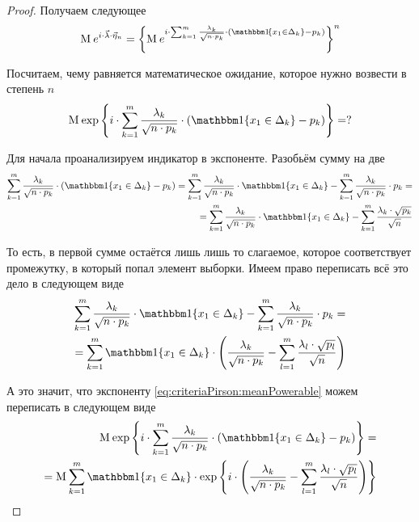 \begin{proof}
  Получаем следующее
  \begin{align*}
      \mean{e^{i \cdot \vec{\lambda} \cdot \vec{\eta}_n}}
      = \left\{ \mean{e^{i \cdot \sum_{k=1}^{m}\frac{\lambda_k}{
          \sqrt{n \cdot p_k}} \cdot \left(
          \Indicator{x_1 \in \Delta_k} - p_k \right)}} \right\}^n
  \end{align*}

  Посчитаем, чему равняется математическое ожидание, которое нужно возвести
  в степень $n$
  \begin{equation}\label{eq:criteriaPirson:meanPowerable}
      \mean{\exp{\left\{ i \cdot \sum_{k=1}^{m}\frac{\lambda_k}{
          \sqrt{n \cdot p_k}} \cdot \left(
          \Indicator{x_1 \in \Delta_k} - p_k \right) \right\}}} = ?
  \end{equation}

  Для начала проанализируем индикатор в экспоненте.
  Разобьём сумму на две
  \begin{align*}
      \sum_{k=1}^{m}\frac{\lambda_k}{\sqrt{n \cdot p_k}} \cdot \left(
          \Indicator{x_1 \in \Delta_k} - p_k \right)
      = \sum_{k=1}^{m}\frac{\lambda_k}{\sqrt{n \cdot p_k}}
          \cdot \Indicator{x_1 \in \Delta_k}
      - \sum_{k=1}^{m}\frac{\lambda_k}{\sqrt{n \cdot p_k}} \cdot p_k = \\
      = \sum_{k=1}^{m}\frac{\lambda_k}{\sqrt{n \cdot p_k}}
          \cdot \Indicator{x_1 \in \Delta_k}
      - \sum_{k=1}^{m}\frac{\lambda_k \cdot \sqrt{p_k}}{\sqrt{n}}
  \end{align*}

  То есть, в первой сумме остаётся лишь лишь то слагаемое, которое
  соответствует промежутку, в который попал элемент выборки. Имеем право
  переписать всё это дело в следующем виде
  \begin{align*}
      \sum_{k=1}^{m}\frac{\lambda_k}{\sqrt{n \cdot p_k}}
          \cdot \Indicator{x_1 \in \Delta_k}
      - \sum_{k=1}^{m}\frac{\lambda_k}{\sqrt{n \cdot p_k}} \cdot p_k = \\
      = \sum_{k=1}^{m} \Indicator{x_1 \in \Delta_k} \cdot \left(
      \frac{\lambda_k}{\sqrt{n \cdot p_k}} - \sum_{l=1}^{m}
          \frac{\lambda_l \cdot \sqrt{p_l}}{\sqrt{n}} \right)
  \end{align*}

  А это значит, что экспоненту \eqref{eq:criteriaPirson:meanPowerable} можем
  переписать в следующем виде
  \begin{align*}
      \mean{\exp{\left\{ i \cdot \sum_{k=1}^{m}\frac{\lambda_k}{
          \sqrt{n \cdot p_k}} \cdot \left(
          \Indicator{x_1 \in \Delta_k} - p_k \right) \right\}}} = \\
      = \mean{\sum_{k=1}^{m} \Indicator{x_1 \in \Delta_k} \cdot
      \exp{\left\{ i \cdot \left( \frac{\lambda_k}{\sqrt{n \cdot p_k}}
          - \sum_{l=1}^{m} \frac{\lambda_l \cdot \sqrt{p_l}}{\sqrt{n}}
          \right) \right\}}}
  \end{align*}


\end{proof}
